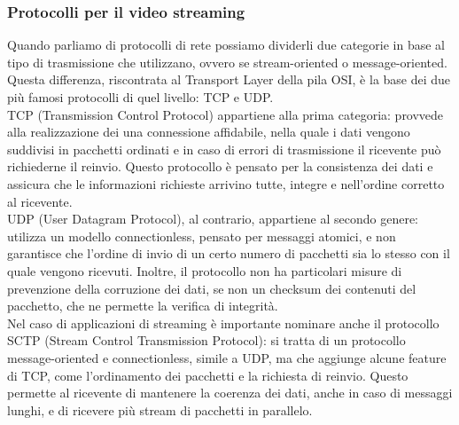 			\subsubsection{Protocolli per il video streaming}
			Quando parliamo di protocolli di rete possiamo dividerli due categorie in base al tipo di trasmissione che utilizzano, ovvero se stream-oriented o message-oriented. Questa differenza, riscontrata al Transport Layer della pila OSI, è la base dei due più famosi protocolli di quel livello: TCP e UDP.\@
			\\
			TCP (Transmission Control Protocol) appartiene alla prima categoria: provvede alla realizzazione dei una connessione affidabile, nella quale i dati vengono suddivisi in pacchetti ordinati e in caso di errori di trasmissione il ricevente può richiederne il reinvio. Questo protocollo è pensato per la consistenza dei dati e assicura che le informazioni richieste arrivino tutte, integre e nell'ordine corretto al ricevente.
			\\
			UDP (User Datagram Protocol), al contrario, appartiene al secondo genere: utilizza un modello connectionless, pensato per messaggi atomici, e non garantisce che l'ordine di invio di un certo numero di pacchetti sia lo stesso con il quale vengono ricevuti. Inoltre, il protocollo non ha particolari misure di prevenzione della corruzione dei dati, se non un checksum dei contenuti del pacchetto, che ne permette la verifica di integrità.
			\\
			Nel caso di applicazioni di streaming è importante nominare anche il protocollo SCTP (Stream Control Transmission Protocol): si tratta di un protocollo message-oriented e connectionless, simile a UDP, ma che aggiunge alcune feature di TCP, come l'ordinamento dei pacchetti e la richiesta di reinvio. Questo permette al ricevente di mantenere la coerenza dei dati, anche in caso di messaggi lunghi, e di ricevere più stream di pacchetti in parallelo.

